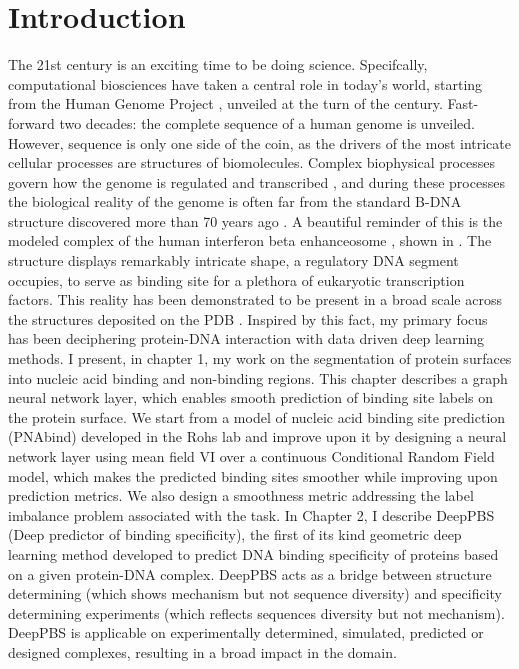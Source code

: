 \section*{Introduction}

The 21st century is an exciting time to be doing science. Specifcally, computational biosciences have taken a central role in today's world, starting from the Human Genome Project \citep{international2001initial}, unveiled at the turn of the century. Fast-forward  two decades: the complete sequence of a human genome  \citep{nurk2022complete} is unveiled. However, sequence is only one side of the coin, as the drivers of the most intricate cellular processes are structures of biomolecules. Complex biophysical processes govern how the genome is regulated and transcribed \citep{lambert2018human}, and during these processes the biological reality of the genome is often far from the standard B-DNA structure discovered more than 70 years ago \citep{watson1953}. A beautiful reminder of this is the modeled complex of the human interferon beta enhanceosome \citep{panne2007atomic}, shown in . The structure displays remarkably intricate shape, a regulatory DNA segment occupies, to serve as binding site for a plethora of eukaryotic transcription factors. This reality has been demonstrated \citep{rohs2009role} to be present in a broad scale across the structures deposited on the PDB \citep{berman2000protein}. Inspired by this fact, my primary focus has been deciphering protein-DNA interaction with data driven deep learning methods. I present, in chapter 1,
my work on the segmentation of protein surfaces into nucleic acid binding and non-binding regions. This chapter describes a graph neural network layer, which enables smooth prediction of binding site labels on the protein surface. We start from a model of nucleic acid binding site
prediction (PNAbind) developed in the Rohs lab and improve upon it by designing a neural network layer using mean field
VI over a continuous Conditional Random Field model, which makes the predicted binding sites smoother while improving upon prediction metrics. We also design a smoothness metric addressing the label imbalance problem associated with the task.
In Chapter 2, I describe DeepPBS (Deep predictor of binding specificity), the first of its kind geometric deep learning method developed to predict DNA binding specificity of proteins based on a given protein-DNA complex. DeepPBS acts as a bridge between structure determining (which shows mechanism but not sequence diversity) and specificity determining experiments (which reflects sequences diversity but not mechanism). DeepPBS is applicable on experimentally determined, simulated, predicted or designed complexes, resulting in a broad impact in the domain.

